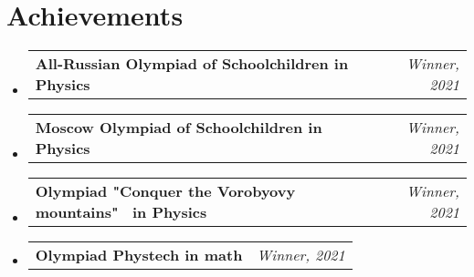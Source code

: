 \documentclass[a4paper,11pt]{article}
\makeatletter
\newcommand{\resumePOR}[3]{
\vspace{0.5mm}\item
    \begin{tabular*}{0.97\textwidth}[t]{l@{\extracolsep{\fill}}r}
        \textbf{#1}\hspace{0.3mm}#2 & \textit{\small{#3}} 
    \end{tabular*}
    \vspace{-2mm}
}
\newcommand{\resumeSubHeadingListStart}{\begin{itemize}[leftmargin=*,labelsep=0mm]}
\newcommand{\resumeSubHeadingListEnd}{\end{itemize}\vspace{2mm}}
\makeatother
\begin{document}
    




\section{\textbf{Achievements}}
\vspace{-0.4mm}
\resumeSubHeadingListStart
\resumePOR{All-Russian Olympiad of Schoolchildren in Physics} %
    {} %
    {Winner, 2021} %
    
\resumePOR{Moscow Olympiad of Schoolchildren in Physics} %
    {} %
    {Winner, 2021} %
    
\resumePOR{Olympiad "Conquer the Vorobyovy mountains" \ in Physics} %
    {} %
    {Winner, 2021} %
    
\resumePOR{Olympiad Phystech in math} %
    {} %
    {Winner, 2021} %
\resumeSubHeadingListEnd
\vspace{-5mm}



\end{document}
